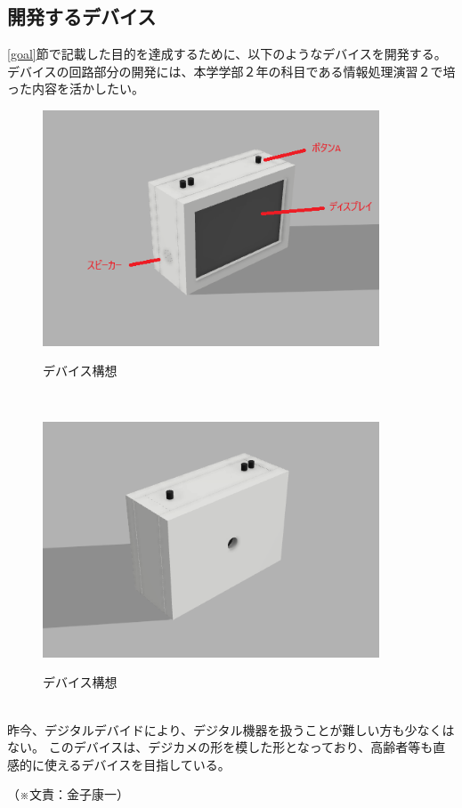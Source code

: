\documentclass[11pt,a4paper]{report}
\newcommand{\Writer}[1]{
  \normalsize
  \begin{flushright}
    （※文責：#1）
  \end{flushright}
}
\begin{document}
\subsection{開発するデバイス}
\noindent\space
\ref{goal}節で記載した目的を達成するために、以下のようなデバイスを開発する。
デバイスの回路部分の開発には、本学学部２年の科目である情報処理演習２で培った内容を活かしたい。
\begin{figure}[htbp]
  \centering %
  \includegraphics[width=100mm]{images/cad1.png}\\
  \caption{デバイス構想}
  \label{fig:cad1}
\end{figure}\\
\begin{figure}[htbp]
  \centering %
  \includegraphics[width=100mm]{images/cad2.png}\\
  \caption{デバイス構想}
  \label{fig:cad2}
\end{figure}\\
昨今、デジタルデバイドにより、デジタル機器を扱うことが難しい方も少なくはない。
このデバイスは、デジカメの形を模した形となっており、高齢者等も直感的に使えるデバイスを目指している。
\Writer{金子康一}
\end{document}
